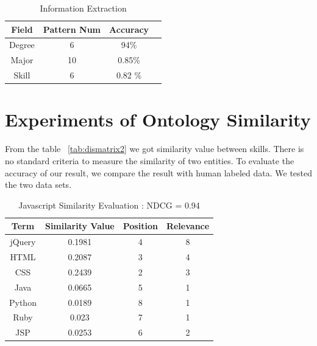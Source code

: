 \begin{table}[ht]
\caption{Information Extraction} %
\centering %
\begin{tabular}{   | c | c | c | c |   }
 \hline
                     Field   & Pattern Num & Accuracy     \\
 \hline
                     Degree & 6         & 94\%         \\
 \hline
                     Major  & 10        & 0.85\%      \\
 \hline
                     Skill  & 6         & 0.82 \%      \\
 \hline
\end{tabular}
\label{tab:ieaccura} %
\end{table}

\section{Experiments of Ontology Similarity}

From the table ~\ref{tab:dismatrix2} we got similarity value between skills. There is no standard criteria to measure the similarity of two entities.  To evaluate the accuracy of our result, we compare the result with human labeled data. We tested the two data sets.



\begin{table}
\centering
\caption{ Javascript Similarity Evaluation : NDCG = 0.94 }
\begin{tabular}{ | c | c | c  | c |  }
 \hline
    Term     &  Similarity Value  &  Position   & Relevance     \\  \hline
    jQuery   &  0.1981            &      4      &   8        \\
     HTML    &  0.2087            &      3      &   4         \\
     CSS     &  0.2439            &      2      &   3   \\
     Java    &  0.0665            &      5      &   1   \\
    Python   &  0.0189            &      8      &   1   \\
     Ruby    &  0.023             &      7      &   1    \\
     JSP     &  0.0253            &      6      &   2    \\
 \hline
\end{tabular}
\label{tab:simcompare1}
\end{table}


